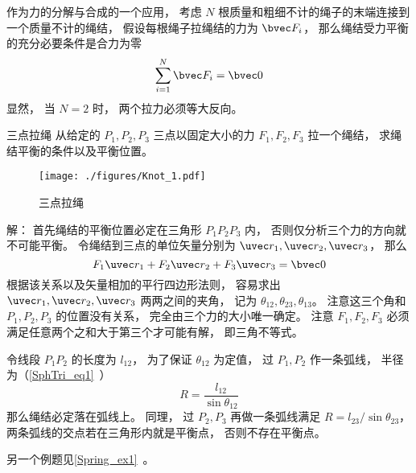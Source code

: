 

作为力的分解与合成的一个应用， 考虑 $N$ 根质量和粗细不计的绳子的末端连接到一个质量不计的绳结， 假设每根绳子拉绳结的力为 $\bvec F_i$， 那么绳结受力平衡的充分必要条件是合力为零
\begin{equation}
\sum_{i=1}^N \bvec F_i = \bvec 0
\end{equation}
显然， 当 $N = 2$ 时， 两个拉力必须等大反向。

\begin{example}{三点拉绳}
从给定的 $P_1,P_2,P_3$ 三点以固定大小的力 $F_1, F_2, F_3$ 拉一个绳结， 求绳结平衡的条件以及平衡位置。
\begin{figure}[ht]
\centering
\texttt{[image: ./figures/Knot\_1.pdf]}
\caption{三点拉绳} \label{Knot_fig1}
\end{figure}

解： 首先绳结的平衡位置必定在三角形 $P_1 P_2 P_3$ 内， 否则仅分析三个力的方向就不可能平衡。 令绳结到三点的单位矢量分别为 $\uvec r_1, \uvec r_2, \uvec r_3$， 那么
\begin{equation}
F_1 \uvec r_1 + F_2 \uvec r_2 + F_3 \uvec r_3 = \bvec 0
\end{equation}
根据该关系以及矢量相加的平行四边形法则， 容易求出 $\uvec r_1, \uvec r_2, \uvec r_3$ 两两之间的夹角， 记为 $\theta_{12}, \theta_{23}, \theta_{13}$。 注意这三个角和 $P_1, P_2, P_3$ 的位置没有关系， 完全由三个力的大小唯一确定。 注意 $F_1, F_2, F_3$ 必须满足任意两个之和大于第三个才可能有解， 即三角不等式。

令线段 $P_1P_2$ 的长度为 $l_{12}$， 为了保证 $\theta_{12}$ 为定值， 过 $P_1, P_2$ 作一条弧线， 半径为（\autoref{SphTri_eq1}~）
\begin{equation}
R = \frac{l_{12}}{\sin\theta_{12}}
\end{equation}
那么绳结必定落在弧线上。 同理， 过 $P_2, P_3$ 再做一条弧线满足 $R = l_{23}/\sin\theta_{23}$， 两条弧线的交点若在三角形内就是平衡点， 否则不存在平衡点。
\end{example}

另一个例题见\autoref{Spring_ex1}~。
